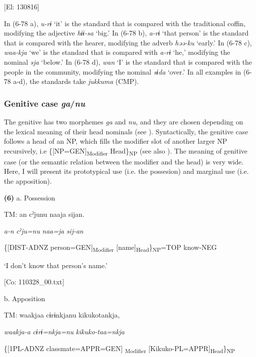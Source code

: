       [El: 130816]

In (6-78 a), \textit{u-rɨ} ‘it’ is the standard that is compared with the traditional coffin, modifying the adjective \textit{hɨɨ-sa} ‘big.’ In (6-78 b), \textit{a-rɨ} ‘that person’ is the standard that is compared with the hearer, modifying the adverb \textit{həə-ku} ‘early.’ In (6-78 c), \textit{waa-kja} ‘we’ is the standard that is compared with \textit{a-rɨ} ‘he,’ modifying the nominal \textit{sja} ‘below.’ In (6-78 d), \textit{wan} ‘I’ is the standard that is compared with the people in the community, modifying the nominal \textit{sɨda} ‘over.’ In all examples in (6-78 a-d), the standards take \textit{jukkuma} (CMP).

\subsubsection{ Genitive case \textit{ga}/\textit{nu}}

The genitive has two morphemes \textit{ga} and \textit{nu}, and they are chosen depending on the lexical meaning of their head nominals (see ). Syntactically, the genitive case follows a head of an NP, which fills the modifier slot of another larger NP recursively, i.e \{[NP=GEN]\textsubscript{Modifier} Head\}\textsubscript{NP} (see also ). The meaning of genitive case (or the semantic relation between the modifier and the head) is very wide. Here, I will present its prototypical use (i.e. the possesion) and marginal use (i.e. the apposition).

\textbf{(6)}  a.  Possession

    TM:  an  cˀjunu  naaja  sijan.

      \textit{a-n}  \textit{cˀju=nu}  \textit{naa=ja}  \textit{sij-an}

      \{[DIST-ADNZ  person=GEN]\textsubscript{Modifier}  [name]\textsubscript{Head}\}\textsubscript{NP}=TOP  know-NEG

      ‘I don’t know that person’s name.’

      [Co: 110328\_00.txt]

  b.  Apposition

    TM:  waakjaa  cɨrɨnkjanu  kikukotankja,

      \textit{waakja-a}  \textit{cɨrɨ=nkja=nu}  \textit{kikuko-taa=nkja}

      \{[1PL-ADNZ  classmate=APPR=GEN]\textsubscript{ Modifier}  [Kikuko-PL=APPR]\textsubscript{Head}\}\textsubscript{NP}

